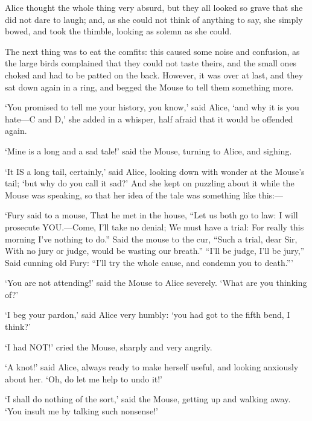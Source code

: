 \documentclass[12pt]{book}
\begin{document}
\begin{Parallel}[p]{}{}
{Alice thought the whole thing very absurd, but they all looked so grave that she did not dare to laugh; and, as she could not think of anything to say, she simply bowed, and took the thimble, looking as solemn as she could.

The next thing was to eat the comfits: this caused some noise and confusion, as the large birds complained that they could not taste theirs, and the small ones choked and had to be patted on the back. However, it was over at last, and they sat down again in a ring, and begged the Mouse to tell them something more.

‘You promised to tell me your history, you know,’ said Alice, ‘and why it is you hate—C and D,’ she added in a whisper, half afraid that it would be offended again.

‘Mine is a long and a sad tale!’ said the Mouse, turning to Alice, and sighing.

‘It IS a long tail, certainly,’ said Alice, looking down with wonder at the Mouse’s tail; ‘but why do you call it sad?’ And she kept on puzzling about it while the Mouse was speaking, so that her idea of the tale was something like this:—

         ‘Fury said to a
         mouse, That he
        met in the
       house,
     “Let us
      both go to
       law: I will
        prosecute
         YOU.—Come,
           I’ll take no
           denial; We
          must have a
        trial: For
      really this
     morning I’ve
    nothing
    to do.”
     Said the
      mouse to the
       cur, “Such
        a trial,
         dear Sir,
            With
          no jury
        or judge,
       would be
      wasting
      our
      breath.”
       “I’ll be
        judge, I’ll
         be jury,”
            Said
         cunning
          old Fury:
          “I’ll
          try the
            whole
            cause,
              and
           condemn
           you
          to
           death.”’


‘You are not attending!’ said the Mouse to Alice severely. ‘What are you thinking of?’

‘I beg your pardon,’ said Alice very humbly: ‘you had got to the fifth bend, I think?’

‘I had NOT!’ cried the Mouse, sharply and very angrily.

‘A knot!’ said Alice, always ready to make herself useful, and looking anxiously about her. ‘Oh, do let me help to undo it!’

‘I shall do nothing of the sort,’ said the Mouse, getting up and walking away. ‘You insult me by talking such nonsense!’

}
\end{Parallel}
\end{document}

